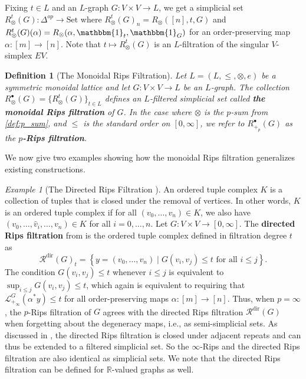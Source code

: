\documentclass[a4paper,11pt]{article}
\newcommand{\Set}{\mathrm{Set}}
\newcommand{\Id}{\mathbbm{1}}
\newcommand{\tensor}{\otimes}
\newcounter{dummy}\numberwithin{dummy}{section}
\newtheorem{definition}[dummy]{Definition}
\theoremstyle{remark}
\newtheorem{example}[dummy]{Example}
\begin{document}
Fixing $t\in L$ and an $L$-graph $G\colon V\times V\to L$, we get a simplicial set $R_\tensor^t(G):\Delta^{op}\to\Set$ where $R_\tensor^t(G)_n=R_\tensor([n],t,G)$ and $R_\tensor^t(G)(\alpha)=R_\tensor(\alpha,\Id_t,\Id_G)$ for an order-preserving map $\alpha:[m]\to[n]$. Note that $t\mapsto R_\tensor^t(G)$ is an $L$-filtration of the singular $V$-simplex $EV$.

\begin{definition}[The Monoidal Rips Filtration]\label{def:monoidal_rips_filtration}
Let $L=(L,\leq,\tensor,e)$ be a symmetric monoidal lattice and let $G\colon V\times V\to L$ be an $L$-graph. The collection $R^\bullet_\tensor(G)=\{R^t_\tensor(G)\}_{t\in L}$ defines an $L$-filtered simplicial set called \textbf{the monoidal Rips filtration} of $G$. In the case where $\tensor$ is the $p$-sum from \cref{def:p_sum}, and $\leq$ is the standard order on $[0,\infty]$, we refer to $R^\bullet_{+_p}(G)$ as the \textbf{$p$-Rips filtration}.
\end{definition}

We now give two examples showing how the monoidal Rips filtration generalizes existing constructions.

\begin{example}[The Directed Rips Filtration {\cite{turner2019rips}}]\label{ex:recovering_directed_rips}
An ordered tuple complex $K$ is a collection of tuples that is closed under the removal of vertices. In other words, $K$ is an ordered tuple complex if for all $(v_0,\ldots,v_n)\in K$, we also have $(v_0,\ldots,\hat{v}_i,\ldots,v_n)\in K$ for all $i=0,\ldots,n$. Let $G\colon V\times V\to [0, \infty]$. The \textbf{directed Rips filtration} from \cite{turner2019rips} is the ordered tuple complex defined in filtration degree $t$ as
 \begin{equation*}
     \mathcal{R}^\text{dir}(G)_t = \left\{y=(v_0,\ldots, v_n)\mid G(v_i, v_j)\leq t\text{ for all }i\leq j\right\}.
 \end{equation*}
The condition $G(v_i, v_j)\leq t$ whenever $i\leq j$ is equivalent to $\sup_{i\leq j}G(v_i, v_j)\leq t$, which again is equivalent to requiring that $\mathcal{L}^G_{+_\infty}(\alpha^*y)\leq t$ for all order-preserving maps $\alpha\colon[m]\to[n]$. Thus, when $p=\infty$, the $p$-Rips filtration of $G$ agrees with the directed Rips filtration $\mathcal{R}^\text{dir}(G)$ when forgetting about the degeneracy maps, i.e., as semi-simplicial sets. As discussed in \cite{turner2019rips}, the directed Rips filtration is closed under adjacent repeats and can thus be extended to a filtered simplicial set. So the $\infty$-Rips and the directed Rips filtration are also identical as simplicial sets. We note that the directed Rips filtration can be defined for $\mathbb{R}$-valued graphs as well.
\end{example}
\end{document}
